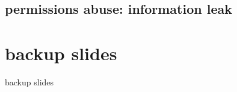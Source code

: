\subsection{permissions abuse: information leak}








\section{backup slides}
\begin{frame}{backup slides}
\end{frame}


